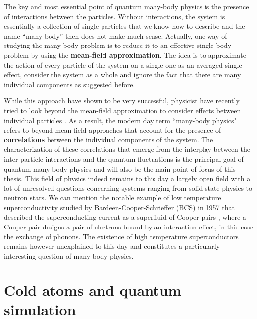 The key and most essential point of quantum many-body physics is the presence of interactions between the particles. Without interactions, the system is essentially a collection of single particles that we know how to describe and the name ``many-body'' then does not make much sense. Actually, one way of studying the many-body problem is to reduce it to an effective single body problem by using the \textbf{mean-field approximation}. The idea is to approximate the action of every particle of the system on a single one as an averaged single effect, \ie consider the system as a whole and ignore the fact that there are many individual components as suggested before.

While this approach have shown to be very successful, physicist have recently tried to look beyond the mean-field approximation to consider effects between individual particles \cite{lavoine2021,papp2008bragg,schweigler2017experimental,wenz2013few}. As a result, the modern day term ``many-body physics" refers to beyond mean-field approaches that account for the presence of \textbf{correlations} between the individual components of the system. The characterization of these correlations that emerge from the interplay between the inter-particle interactions and the quantum fluctuations is the principal goal of quantum many-body physics and will also be the main point of focus of this thesis. This field of physics indeed remains to this day a largely open field with a lot of unresolved questions concerning systems ranging from solid state physics to neutron stars. We can mention the notable example of low temperature superconductivity studied by Bardeen-Cooper-Schrieffer \cite{bardeen1957theory} (BCS) in 1957 that described the superconducting current as a superfluid of Cooper pairs \cite{cooper1956bound}, where a Cooper pair designs a pair of electrons bound by an interaction effect, in this case the exchange of phonons. The existence of high temperature superconductors remains however unexplained to this day and constitutes a particularly interesting question of many-body physics.

\section*{Cold atoms and quantum simulation}

